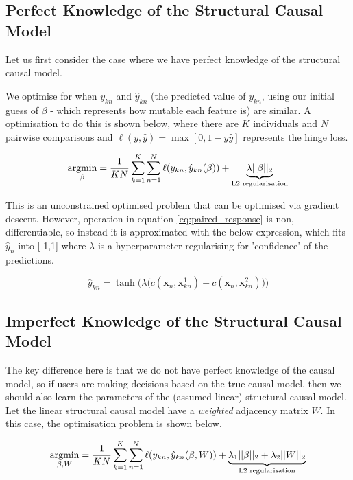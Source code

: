 \subsection{Perfect Knowledge of the Structural Causal Model}

Let us first consider the case where we have perfect knowledge of the structural causal model. 

We optimise for when $y_{kn}$ and $\hat{y}_{kn}$ (the predicted value of $y_{kn}$, using our initial guess of $\beta$ - which represents how mutable each feature is) are similar. A optimisation to do this is shown below, where there are $K$ individuals and $N$ pairwise comparisons and $\ell(y, \hat{y}) = \max[0, 1-y\hat{y}]$ represents the hinge loss.

\begin{equation}
	\operatorname*{argmin}_\beta = \frac{1}{KN} \sum_{k=1}^K \sum_{n=1}^N \ell (y_{kn}, \hat{y}_{kn}(\beta)) + \underbrace{\lambda ||\beta||_2}_{\text{L2 regularisation}}
\end{equation}

This is an unconstrained optimised problem that can be optimised via gradient descent. However, operation in equation \ref{eq:paired_response} is non, differentiable, so instead it is approximated with the below expression, which fits $\hat{y}_n$ into [-1,1] where $\lambda$ is a hyperparameter regularising for 'confidence' of the predictions.

\begin{equation} \label{eq:yhat_relaxation}
	\hat{y}_{kn} = \tanh \Bigg(\lambda \Big(c(\mathbf{x}_n, \mathbf{x}^1_{kn}) - c(\mathbf{x}_n, \mathbf{x}^2_{kn})\Big)\Bigg)
\end{equation}

\subsection{Imperfect Knowledge of the Structural Causal Model}

The key difference here is that we do not have perfect knowledge of the causal model, so if users are making decisions based on the true causal model, then we should also learn the parameters of the (assumed linear) structural causal model. Let the linear structural causal model have a \textit{weighted} adjacency matrix $W$. In this case, the optimisation problem is shown below. 

\begin{equation}
	\operatorname*{argmin}_{\beta, W} = \frac{1}{KN} \sum_{k=1}^K \sum_{n=1}^N \ell (y_{kn}, \hat{y}_{kn}(\beta, W)) + \underbrace{\lambda_1 ||\beta||_2 + \lambda_2||W||_2}_{\text{L2 regularisation}}
\end{equation}

